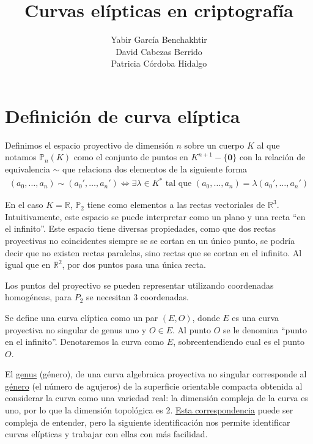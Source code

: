 \documentclass{article}
\begin{document}
\title{\Huge \textbf{Curvas elípticas en criptografía}} \author{Yabir
García Benchakhtir\\ David Cabezas Berrido\\ Patricia Córdoba Hidalgo
} \date{}
\maketitle
\tableofcontents

\newpage

\section{Definición de curva elíptica}

Definimos el espacio proyectivo de dimensión $n$ sobre un cuerpo $K$ al
que notamos $\mathbb{P}_n(K)$ como el conjunto de puntos en
$K^{n+1}-\{\mathbf{0}\}$ con la relación de equivalencia $\sim$ que
relaciona dos elementos de la siguiente forma
    \begin{align*} (a_0,\dots,a_n) \sim (a_0',\dots,a_n') \iff \exists
\lambda\in K^* \text{ tal que } (a_0,\dots,a_n) = \lambda
(a_0',\dots,a_n')
    \end{align*}

En el caso $K=\mathbb{R}$, $\mathbb{P}_2$ tiene como elementos a las rectas
vectoriales de $\mathbb{R}^3$. Intuitivamente, este espacio se puede
interpretar como un plano y una recta ``en el infinito''. Este espacio
tiene diversas propiedades, como que dos rectas proyectivas no
coincidentes siempre se se cortan en un único punto, se podría decir
que no existen rectas paralelas, sino rectas que se cortan en el
infinito. Al igual que en $\mathbb{R}^2$, por dos puntos pasa una
única recta.

Los puntos del proyectivo se pueden representar utilizando coordenadas
homogéneas, para $P_2$ se necesitan 3 coordenadas.

Se define una curva elíptica como un par $(E, O)$, donde $E$ es una
curva proyectiva no singular de genus uno y $O \in E$. Al punto $O$ se
le denomina ``punto en el infinito''. Denotaremos la curva como $E$,
sobreentendiendo cual es el punto $O$.

El
\href{https://en.wikipedia.org/wiki/Genus_(mathematics)#Algebraic_geometry}{genus}
(género), de una curva algebraica proyectiva no singular corresponde
al \href{https://en.wikipedia.org/wiki/Genus_(mathematics)}{género}
(el número de agujeros) de la superficie orientable compacta obtenida
al considerar la curva como una variedad real: la dimensión compleja
de la curva es uno, por lo que la dimensión topológica es
2. \href{https://es.wikipedia.org/wiki/Curva_algebraica#Curvas_complejas_y_superficies_reales}{Esta
correspondencia} puede ser compleja de entender, pero la siguiente
identificación nos permite identificar curvas elípticas y trabajar con
ellas con más facilidad.
\end{document}
